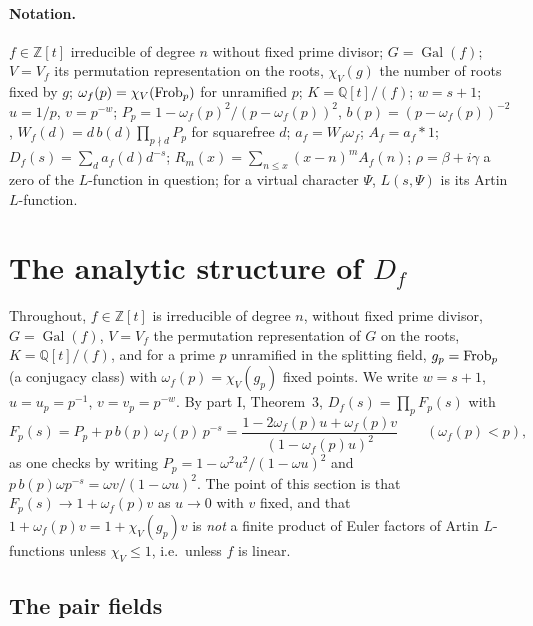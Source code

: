 \documentclass[11pt,a4paper]{article}
\theoremstyle{remark}\newtheorem{remark}[theorem]{Remark}
\newcommand{\Z}{\mathbb{Z}}\newcommand{\Q}{\mathbb{Q}}\newcommand{\F}{\mathbb{F}}\newcommand{\C}{\mathbb{C}}
\begin{document}
\paragraph{Notation.} $f\in\Z[t]$ irreducible of degree $n$ without fixed prime divisor; $G=\operatorname{Gal}(f)$;
$V=V_f$ its permutation representation on the roots, $\chi_V(g)$ the number of roots fixed by $g$;
$\omega_f(p)=\chi_V(\operatorname{Frob}_p)$ for unramified $p$; $K=\Q[t]/(f)$; $w=s+1$; $u=1/p$, $v=p^{-w}$;
$P_p=1-\omega_f(p)^2/(p-\omega_f(p))^2$, $b(p)=(p-\omega_f(p))^{-2}$, $W_f(d)=d\,b(d)\prod_{p\nmid d}P_p$ for squarefree $d$;
$a_f=W_f\omega_f$; $A_f=a_f*1$; $D_f(s)=\sum_da_f(d)d^{-s}$; $R_m(x)=\sum_{n\le x}(x-n)^mA_f(n)$;
$\rho=\beta+i\gamma$ a zero of the $L$-function in question; for a virtual character $\Psi$, $L(s,\Psi)$ is its
Artin $L$-function.

\section{The analytic structure of $D_f$}\label{sec:structure}

Throughout, $f\in\Z[t]$ is irreducible of degree $n$, without fixed prime divisor, $G=\operatorname{Gal}(f)$,
$V=V_f$ the permutation representation of $G$ on the roots, $K=\Q[t]/(f)$, and for a prime $p$ unramified
in the splitting field, $g_p=\operatorname{Frob}_p$ (a conjugacy class) with $\omega_f(p)=\chi_V(g_p)$ fixed points. We
write $w=s+1$, $u=u_p=p^{-1}$, $v=v_p=p^{-w}$. By part I, Theorem~3, $D_f(s)=\prod_pF_p(s)$ with
\begin{equation}\label{eq:Fp}
F_p(s)=P_p+p\,b(p)\,\omega_f(p)\,p^{-s}=\frac{1-2\omega_f(p)u+\omega_f(p)v}{(1-\omega_f(p)u)^2}\qquad(\omega_f(p)<p),
\end{equation}
as one checks by writing $P_p=1-\omega^2u^2/(1-\omega u)^2$ and $p\,b(p)\omega p^{-s}=\omega v/(1-\omega u)^2$.
The point of this section is that $F_p(s)\to1+\omega_f(p)v$ as $u\to0$ with $v$ fixed, and that
$1+\omega_f(p)v=1+\chi_V(g_p)v$ is \emph{not} a finite product of Euler factors of Artin $L$-functions
unless $\chi_V\le1$, i.e.\ unless $f$ is linear.

\subsection{The pair fields}
\end{document}
